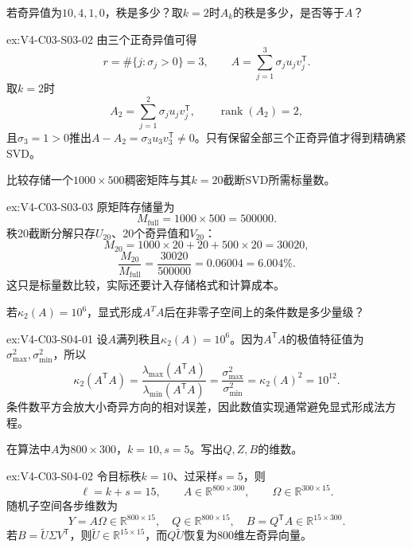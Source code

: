 \begin{SLChapterExercisePairSection}
\begin{exercise}\label{ex:V4-C03-S03-02}
若奇异值为$10,4,1,0$，秩是多少？取$k=2$时$A_k$的秩是多少，是否等于$A$？
\end{exercise}
\ifSLFullEdition
{}\label{sol:V4-C03-S03-02}
\begin{chapterexercisesolution}{ex:V4-C03-S03-02}
由三个正奇异值可得
\[
r=\#\{j:\sigma_j>0\}=3,
\qquad
A=\sum_{j=1}^{3}\sigma_ju_jv_j^{\mathsf T}.
\]
取$k=2$时
\[
A_2=\sum_{j=1}^{2}\sigma_ju_jv_j^{\mathsf T},
\qquad
\operatorname{rank}(A_2)=2,
\]
且$\sigma_3=1>0$推出$A-A_2=\sigma_3u_3v_3^{\mathsf T}\ne0$。只有保留全部三个正奇异值才得到精确紧SVD。
\end{chapterexercisesolution}
\fi

\begin{exercise}\label{ex:V4-C03-S03-03}
比较存储一个$1000\times500$稠密矩阵与其$k=20$截断SVD所需标量数。
\end{exercise}
\ifSLFullEdition
{}\label{sol:V4-C03-S03-03}
\begin{chapterexercisesolution}{ex:V4-C03-S03-03}
原矩阵存储量为
\[
M_{\mathrm{full}}=1000\times500=500000.
\]
秩20截断分解只存$U_{20}$、20个奇异值和$V_{20}$：
\[
M_{20}=1000\times20+20+500\times20=30020,
\]
\[
\frac{M_{20}}{M_{\mathrm{full}}}
=\frac{30020}{500000}=0.06004=6.004\%.
\]
这只是标量数比较，实际还要计入存储格式和计算成本。
\end{chapterexercisesolution}
\fi

\begin{exercise}\label{ex:V4-C03-S04-01}
若$\kappa_2(A)=10^6$，显式形成$A^TA$后在非零子空间上的条件数是多少量级？
\end{exercise}
\ifSLFullEdition
{}\label{sol:V4-C03-S04-01}
\begin{chapterexercisesolution}{ex:V4-C03-S04-01}
设$A$满列秩且$\kappa_2(A)=10^6$。因为$A^{\mathsf T}A$的极值特征值为$\sigma_{\max}^2,\sigma_{\min}^2$，所以
\[
\kappa_2(A^{\mathsf T}A)
=\frac{\lambda_{\max}(A^{\mathsf T}A)}{\lambda_{\min}(A^{\mathsf T}A)}
=\frac{\sigma_{\max}^2}{\sigma_{\min}^2}
=\kappa_2(A)^2=10^{12}.
\]
条件数平方会放大小奇异方向的相对误差，因此数值实现通常避免显式形成法方程。
\end{chapterexercisesolution}
\fi

\begin{exercise}\label{ex:V4-C03-S04-02}
在算法中$A$为$800\times300$，$k=10,s=5$。写出$Q,Z,B$的维数。
\end{exercise}
\ifSLFullEdition
{}\label{sol:V4-C03-S04-02}
\begin{chapterexercisesolution}{ex:V4-C03-S04-02}
令目标秩$k=10$、过采样$s=5$，则
\[
\ell=k+s=15,
\qquad
A\in\mathbb R^{800\times300},
\qquad
\Omega\in\mathbb R^{300\times15}.
\]
随机子空间各步维数为
\[
Y=A\Omega\in\mathbb R^{800\times15},
\quad
Q\in\mathbb R^{800\times15},
\quad
B=Q^{\mathsf T}A\in\mathbb R^{15\times300}.
\]
若$B=\widetilde U\Sigma V^{\mathsf T}$，则$\widetilde U\in\mathbb R^{15\times15}$，而$Q\widetilde U$恢复为800维左奇异向量。
\end{chapterexercisesolution}
\fi


\end{SLChapterExercisePairSection}
